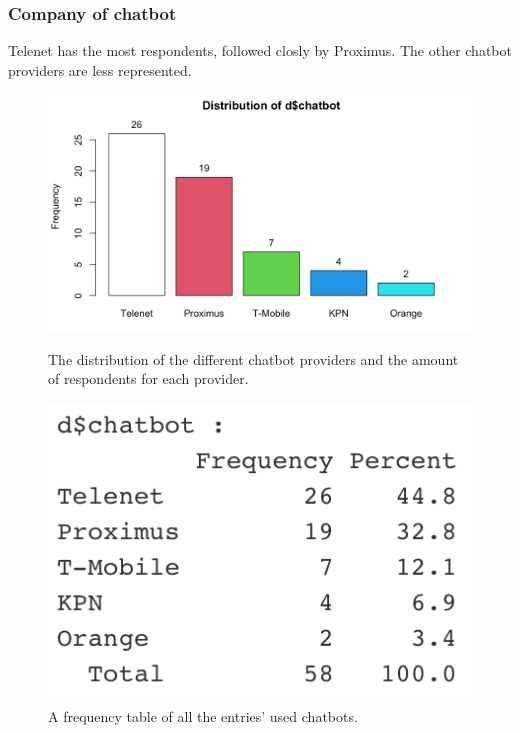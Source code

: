 \subsubsection{Company of chatbot}
Telenet has the most respondents, followed closly by Proximus. The other chatbot providers are less represented. 
\begin{figure}[!htb]
	\includegraphics[width=\linewidth]{../LaTeX/Figures/Environments/ChatbotPlot.png}
	\caption{The distribution of the different chatbot providers and the amount of respondents for each provider.}\label{fig:chatbotPlot}
	\endminipage\hfill
	\includegraphics[width=\linewidth]{../LaTeX/Figures/Environments/ChatbotFreq.png}
	\caption{A frequency table of all the entries' used chatbots.}\label{fig:chatbotFreq}
	\endminipage\hfill
\end{figure}


